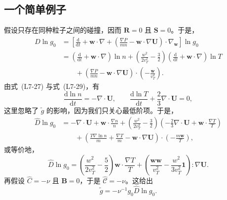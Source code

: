 \subsection{一个简单例子}\label{sec:L7:example}
假设只存在同种粒子之间的碰撞，因而 $\boldsymbol R=0$ 且 $\boldsymbol S=0$。于是，
\begin{equation*}
\begin{aligned}
\widehat D\ln g_0
&=\left[\frac{\mathrm d}{\mathrm dt}+\boldsymbol w\cdot\nabla
 +\left(\frac{\nabla P}{mn}-\boldsymbol w\cdot\nabla\boldsymbol U\right)\cdot\nabla_{\boldsymbol w}\right]\ln g_0\\
&=\left(\frac{\mathrm d}{\mathrm dt}+\boldsymbol w\cdot\nabla\right)\ln n
 +\left(\frac{w^2}{2v_T^2}-\frac32\right)
 \left(\frac{\mathrm d}{\mathrm dt}+\boldsymbol w\cdot\nabla\right)\ln T\\
&\qquad+\left(\frac{\nabla P}{mn}-\boldsymbol w\cdot\nabla\boldsymbol U\right)
 \cdot\left(-\frac{\boldsymbol w}{v_T^2}\right).
\end{aligned}
\end{equation*}
由式~(L7-27) 与式~(L7-29)，有
\begin{equation}
\frac{\mathrm d\ln n}{\mathrm dt}=-\nabla\cdot\boldsymbol U,\qquad
\frac{\mathrm d\ln T}{\mathrm dt}+\frac23\nabla\cdot\boldsymbol U=0,
\tag{L7-37}\label{eq:L7:37}
\end{equation}
这里忽略了 $\widetilde g$ 的影响，因为我们只关心最低阶项。于是，
\begin{equation}
\begin{aligned}
\widehat D\ln g_0
&=-\nabla\cdot\boldsymbol U+\boldsymbol w\cdot\frac{\nabla n}{n}
 +\left(\frac{w^2}{2v_T^2}-\frac32\right)
 \left(-\frac23\nabla\cdot\boldsymbol U+\boldsymbol w\cdot\frac{\nabla T}{T}\right)\\
&\qquad+\left(\frac{T\nabla\ln n}{m}+\frac{\nabla T}{m}
 -\boldsymbol w\cdot\nabla\boldsymbol U\right)\cdot\left(-\frac{m\boldsymbol w}{T}\right),
\end{aligned}\tag{L7-38}\label{eq:L7:38}
\end{equation}
或等价地，
\begin{equation}
\widehat D\ln g_0
=\left(\frac{w^2}{2v_T^2}-\frac52\right)\boldsymbol w\cdot\frac{\nabla T}{T}
 +\left(\frac{\boldsymbol w\boldsymbol w}{v_T^2}
 -\frac{w^2}{3v_T^2}\boldsymbol1\right):\nabla\boldsymbol U.
\tag{L7-39}\label{eq:L7:39}
\end{equation}
再假设 $\widehat C=-\nu$ 且 $\boldsymbol B=0$，于是 $\widehat{\mathcal C}=-\nu$。这给出
\begin{equation}
\widetilde g=-\nu^{-1}g_0\widehat D\ln g_0.
\tag{L7-40}\label{eq:L7:40}
\end{equation}
